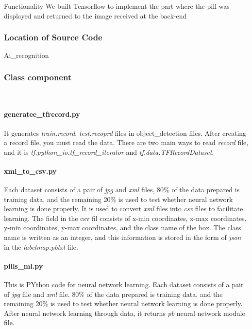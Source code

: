 \documentclass[conference]{IEEEtran}
\begin{document}
\subsubsection{}{}{Functionality}
 We built Tensorflow to implement the part where the pill was displayed and returned to the image received at the back-end\\
 
\subsubsection{Location of Source Code}
Ai\_recognition \\

\subsubsection{Class component}
\\
\paragraph{generatee\_tfrecord.py}
It generates \emph{train.record}, \emph{test.recoprd} files in object\_detection files. After creating a record file, you must read the data. There are two main ways to read \emph{record} file, and it is \emph{tf.python\_io.tf\_record\_iterator} and \emph{tf.data.TFRecordDataset}.\\

\paragraph{xml\_to\_csv.py}
Each dataset consists of a pair of \emph{jpg} and \emph{xml} files, 80\% of the data prepared is training data, and the remaining 20\% is used to test whether neural network learning is done properly. It is used to convert \emph{xml} files into \emph{csv} files to facilitate learning. The field in the csv fil consists of x-min coordinates, x-max coordinates, y-min coordinates, y-max coordinates, and the class name of the box. The class name is written as an integer, and this information is stored in the form of \emph{json} in the \emph{labelmap.pbtxt} file. \\

\paragraph{pills\_ml.py}
This is PYthon code for neural network learning. Each dataset consists of a pair of \emph{jpg} file and \emph{xml} file. 80\% of the data prepared is training data, and the remaining 20\% is used to test whether neural network learning is done properly. After neural network learning through data, it returns \emph{pb} neural network module file. \\
\end{document}
